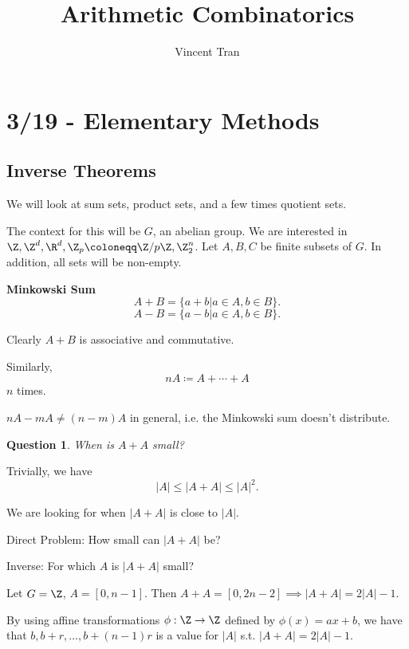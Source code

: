 \documentclass[a4paper]{article}
\title{Arithmetic Combinatorics}
\author{Vincent Tran}
\newtheorem{question}{Question}
\begin{document}
\maketitle

\section{3/19 - Elementary Methods}

\subsection{Inverse Theorems}

We will look at sum sets, product sets, and a few times quotient sets.

The context for this will be $G $, an abelian group. We are interested in $\Z, \Z^d, \R^d, \Z_p \coloneqq \Z / p\Z, \Z_2^n$. Let $A,B,C $ be finite subsets of $G $. In addition, all sets will be non-empty.

\begin{definition}
	\textbf{Minkowski Sum}
	\[
		A + B = \{a+b|a\in A, b\in B\}
	.\]
	\[
		A - B = \{a-b|a\in A, b\in B\}
	.\]

	Clearly $A+B $ is associative and commutative.

	Similarly,
	\[
		nA \coloneqq A + \cdots + A
	\]
	$n $ times.
\end{definition}

\begin{property}
	$nA - mA \ne (n-m)A $ in general, i.e. the Minkowski sum doesn't distribute.
\end{property}

\begin{question}
	When is $A+A $ small?
\end{question}

Trivially, we have
\[
	|A| \le |A+A| \le |A|^2
.\]

We are looking for when $|A+A| $ is close to $|A| $.

Direct Problem: How small can $|A+A| $ be?

Inverse: For which $A $ is $|A+A| $ small?

\begin{example}
	Let $G = \Z $, $A = [0,n-1] $.
	Then $A+A = [0,2n-2] \implies |A+A| = 2|A|-1 $.

	By using affine transformations $\phi: \Z\to \Z $ defined by $\phi(x) = ax+b $, we have that $b, b+r, \ldots, b+(n-1)r $ is a value for $|A| $ s.t. $|A+A| = 2|A| -1 $.
\end{example}
\end{document}
